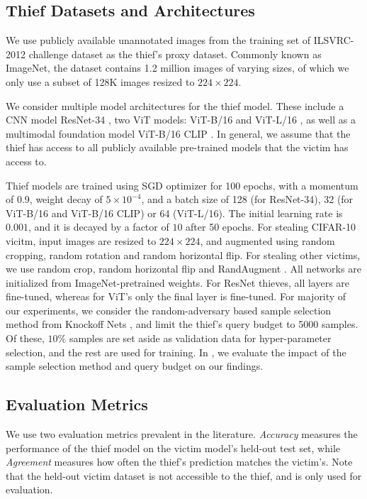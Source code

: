 \subsection{Thief Datasets and Architectures} 

%
We use publicly available unannotated images from the training set of ILSVRC-2012 challenge dataset \cite{russakovsky2015imagenet} as the thief's proxy dataset. Commonly known as ImageNet, the dataset contains 1.2 million images of varying sizes, of which we only use a subset of 128K images resized to $224\times224$. 

We consider multiple model architectures for the thief model. These include a CNN model ResNet-34 \cite{he2016deep}, two ViT models: ViT-B/16 and ViT-L/16 \cite{dosovitskiy2020image}, as well as a multimodal foundation model ViT-B/16 CLIP \cite{radford2021learning}. 
%
In general, we assume that the thief has access to all publicly available pre-trained models that the victim has access to.  

Thief models are trained using SGD optimizer for 100 epochs, with a momentum of 0.9, weight decay of $5 \times 10 ^{-4}$, and a batch size of 128 (for ResNet-34), 32 (for ViT-B/16 and ViT-B/16 CLIP) or 64 (ViT-L/16). The initial learning rate is $0.001$, and it is decayed by a factor of $10$ after 50 epochs. 
For stealing CIFAR-10 vicitm, input images are resized to $224\times224$, and augmented using random cropping, random rotation and random horizontal flip. For stealing other victims, we use random crop, random horizontal flip and RandAugment \cite{cubuk2020randaugment}. 
%
All networks are initialized from ImageNet-pretrained weights. For ResNet thieves, all layers are fine-tuned, whereas for ViT's only the final layer is fine-tuned.
%
 For majority of our experiments, we consider the random-adversary based sample selection method from Knockoff Nets \cite{orekondy2019knockoff}, and limit the thief's query budget to 5000 samples. Of these, $10\%$ samples are set aside as validation data for hyper-parameter selection, and the rest are used for training. 
%
In , we evaluate the impact of the sample selection method and query budget on our findings. 

\subsection{Evaluation Metrics} 
%
We use two evaluation metrics prevalent in the literature. \emph{Accuracy} measures the performance of the thief model on the victim model's held-out test set, while \emph{Agreement} measures how often the thief's prediction matches the victim's. Note that the held-out victim dataset is not accessible to the thief, and is only used for evaluation. 




